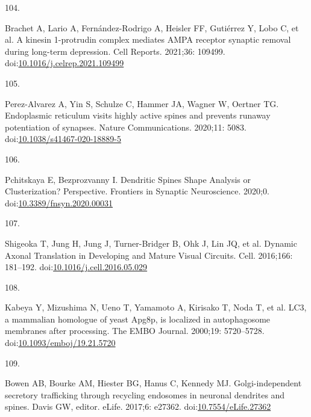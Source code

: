 \documentclass[
  12pt,
  a4paper,
]{book}
\newlength{\cslhangindent}
\newlength{\csllabelwidth}
\newlength{\cslentryspacingunit} %
\newenvironment{CSLReferences}[2] %
 {%
  \setlength{\parindent}{0pt}
  \ifodd #1
  \let\oldpar\par
  \def\par{\hangindent=\cslhangindent\oldpar}
  \fi
  \setlength{\parskip}{#2\cslentryspacingunit}
 }%
 {}
\newcommand{\CSLLeftMargin}[1]{\parbox[t]{\csllabelwidth}{#1}}
\newcommand{\CSLRightInline}[1]{\parbox[t]{\linewidth - \csllabelwidth}{#1}\break}
\begin{document}
\begin{CSLReferences}{0}{0}
\leavevmode{}%
\CSLLeftMargin{104. }%
\CSLRightInline{Brachet A, Lario A, Fernández-Rodrigo A, Heisler FF, Gutiérrez Y, Lobo C, et al. A kinesin 1-protrudin complex mediates {AMPA} receptor synaptic removal during long-term depression. Cell Reports. 2021;36: 109499. doi:\href{https://doi.org/10.1016/j.celrep.2021.109499}{10.1016/j.celrep.2021.109499}}

\leavevmode{}%
\CSLLeftMargin{105. }%
\CSLRightInline{Perez-Alvarez A, Yin S, Schulze C, Hammer JA, Wagner W, Oertner TG. Endoplasmic reticulum visits highly active spines and prevents runaway potentiation of synapses. Nature Communications. 2020;11: 5083. doi:\href{https://doi.org/10.1038/s41467-020-18889-5}{10.1038/s41467-020-18889-5}}

\leavevmode{}%
\CSLLeftMargin{106. }%
\CSLRightInline{Pchitskaya E, Bezprozvanny I. Dendritic {Spines Shape Analysis}\textemdash{{Classification}} or {Clusterization}? {Perspective}. Frontiers in Synaptic Neuroscience. 2020;0. doi:\href{https://doi.org/10.3389/fnsyn.2020.00031}{10.3389/fnsyn.2020.00031}}

\leavevmode{}%
\CSLLeftMargin{107. }%
\CSLRightInline{Shigeoka T, Jung H, Jung J, Turner-Bridger B, Ohk J, Lin JQ, et al. Dynamic {Axonal Translation} in {Developing} and {Mature Visual Circuits}. Cell. 2016;166: 181--192. doi:\href{https://doi.org/10.1016/j.cell.2016.05.029}{10.1016/j.cell.2016.05.029}}

\leavevmode{}%
\CSLLeftMargin{108. }%
\CSLRightInline{Kabeya Y, Mizushima N, Ueno T, Yamamoto A, Kirisako T, Noda T, et al. {LC3}, a mammalian homologue of yeast {Apg8p}, is localized in autophagosome membranes after processing. The EMBO Journal. 2000;19: 5720--5728. doi:\href{https://doi.org/10.1093/emboj/19.21.5720}{10.1093/emboj/19.21.5720}}

\leavevmode{}%
\CSLLeftMargin{109. }%
\CSLRightInline{Bowen AB, Bourke AM, Hiester BG, Hanus C, Kennedy MJ. Golgi-independent secretory trafficking through recycling endosomes in neuronal dendrites and spines. Davis GW, editor. eLife. 2017;6: e27362. doi:\href{https://doi.org/10.7554/eLife.27362}{10.7554/eLife.27362}}


\end{CSLReferences}
\end{document}
